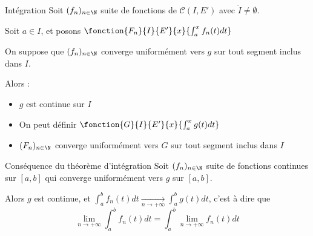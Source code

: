 \begin{theoreme}{Intégration}{}
    Soit $(f_n)_{n \in \N}$ suite de fonctions de $\mathscr C (I, E')$ avec
    $\mathring I \neq \emptyset$.

    Soit $a \in I$, et posons $\fonction{F_n}{I}{E'}{x}{\int_a^x f_n(t) dt}$

    On suppose que $(f_n)_{n \in \N}$ converge uniformément vers $g$ 
    sur tout segment inclus dans $I$.

    Alors : 
    \begin{itemize}
        \item $g$ est continue sur $I$
        \item On peut définir $\fonction{G}{I}{E'}{x}{\int_a^x g(t) dt}$
        \item $(F_n)_{n \in \N}$ converge uniformément vers $G$ sur tout segment inclus dans $I$
    \end{itemize}
\end{theoreme}

\begin{corollaire}{Conséquence du théorème d'intégration}{}
    Soit $(f_n)_{n \in \N}$ suite de fonctions continues sur 
    $[a, b]$ qui converge uniformément vers $g$ sur $[a, b]$. 
    
    Alors $g$ est continue, et
    $\displaystyle \int_a^b f_n(t) dt \xrightarrow[n\to +\infty]{} \int_a^b g(t) dt$, c'est à dire 
    que $$\lim_{n \to +\infty} \int_a^b f_n(t) dt = \int_a^b \lim_{n \to +\infty} f_n(t) dt$$ 
\end{corollaire}



